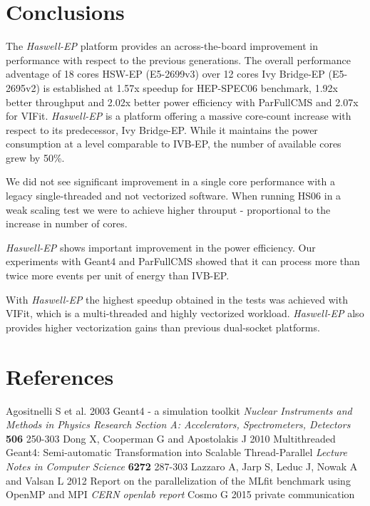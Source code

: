 \documentclass[a4paper]{jpconf}
\begin{document}
\section{Conclusions}
The \textit{Haswell-EP} platform provides an across-the-board improvement in performance with respect to the previous generations. The overall performance adventage of 18 cores HSW-EP (E5-2699v3) over 12 cores Ivy Bridge-EP (E5-2695v2) is established at 1.57x speedup for HEP-SPEC06 benchmark, 1.92x better throughput and 2.02x better power efficiency with ParFullCMS and 2.07x for VIFit.
\textit{Haswell-EP} is a platform offering a massive core-count increase with respect to its predecessor, Ivy Bridge-EP. While it maintains the power consumption at a level comparable to IVB-EP, the number of available cores grew by 50\%.

We did not see significant improvement in a single core performance with a legacy single-threaded and not vectorized software. When running HS06 in a weak scaling test we were to achieve higher throuput - proportional to the increase in number of cores.

\textit{Haswell-EP} shows important improvement in the power efficiency. Our experiments with Geant4 and ParFullCMS showed that it can process more than twice more events per unit of energy than IVB-EP.

With \textit{Haswell-EP} the highest speedup obtained in the tests was achieved with VIFit, which is a multi-threaded and highly vectorized workload.
\textit{Haswell-EP} also provides higher vectorization gains than previous dual-socket platforms.

\section*{References}

\begin{thebibliography}{dupa}
 Agositnelli S et al. 2003 Geant4 - a simulation toolkit \textit{Nuclear Instruments and Methods in Physics Research Section A: Accelerators, Spectrometers, Detectors} \textbf{506} 250-303
 Dong X, Cooperman G and Apostolakis J 2010 Multithreaded Geant4: Semi-automatic Transformation into Scalable Thread-Parallel \textit{Lecture Notes in Computer Science} \textbf{6272} 287-303
 Lazzaro A, Jarp S, Leduc J, Nowak A and Valsan L 2012 Report on the parallelization of the MLfit benchmark using OpenMP and MPI \textit{CERN openlab report}
 Cosmo G 2015 private communication
\end{thebibliography}
\end{document}
